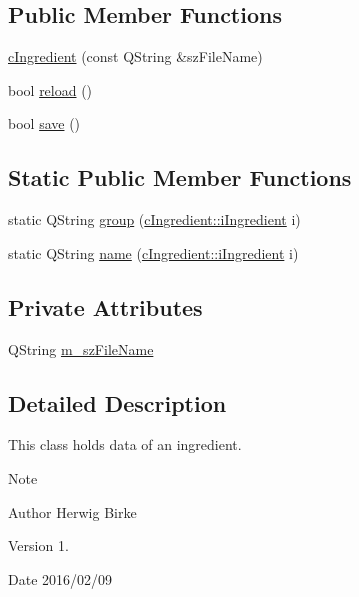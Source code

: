 \subsection*{Public Member Functions}
\begin{DoxyCompactItemize}
\item 
\hyperlink{classc_ingredient_ab7d4cee251dc104cf633c4199731f65d}{c\+Ingredient} (const Q\+String \&sz\+File\+Name)
\item 
bool \hyperlink{classc_ingredient_aaeb73aa8ba4aec026afde7aef7c0be93}{reload} ()
\item 
bool \hyperlink{classc_ingredient_a0f31754644654df8840c4960cfad1250}{save} ()
\end{DoxyCompactItemize}
\subsection*{Static Public Member Functions}
\begin{DoxyCompactItemize}
\item 
static Q\+String \hyperlink{classc_ingredient_aa0da12658feecfd205c20e3a0335e9b0}{group} (\hyperlink{classc_ingredient_acf023723841ec66cd6368a25e3174a28}{c\+Ingredient\+::i\+Ingredient} i)
\item 
static Q\+String \hyperlink{classc_ingredient_a64d6e9c85a6b1527de28ed1f1185be29}{name} (\hyperlink{classc_ingredient_acf023723841ec66cd6368a25e3174a28}{c\+Ingredient\+::i\+Ingredient} i)
\end{DoxyCompactItemize}
\subsection*{Private Attributes}
\begin{DoxyCompactItemize}
\item 
Q\+String \hyperlink{classc_ingredient_af52301d7db3ff89d1af599408aaf06ea}{m\+\_\+sz\+File\+Name}
\end{DoxyCompactItemize}


\subsection{Detailed Description}
This class holds data of an ingredient.

\begin{DoxyNote}{Note}

\end{DoxyNote}
\begin{DoxyAuthor}{Author}
Herwig Birke
\end{DoxyAuthor}
\begin{DoxyVersion}{Version}
1.
\end{DoxyVersion}
\begin{DoxyDate}{Date}
2016/02/09 
\end{DoxyDate}


